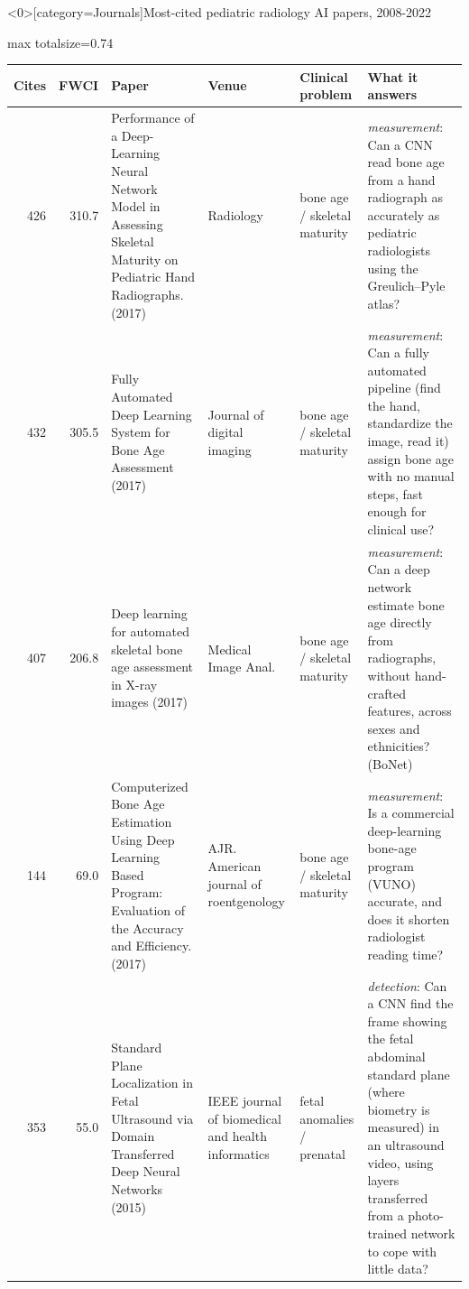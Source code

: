 \documentclass[aspectratio=169]{beamer}
\renewcommand{\arraystretch}{1.08}
\begin{document}
\begin{frame}<0>[category=Journals]{Most-cited pediatric radiology AI papers, 2008-2022}
\tiny
\begin{adjustbox}{max totalsize={\textwidth}{0.74\textheight}}
\renewcommand{\arraystretch}{1.2}
\begin{tabular}{|r|r|>{\raggedright\arraybackslash}p{}|>{\raggedright\arraybackslash}p{}|>{\raggedright\arraybackslash}p{}|>{\raggedright\arraybackslash}p{}|}
\hline \textbf{Cites} & \textbf{FWCI} & \textbf{Paper} & \textbf{Venue} & \textbf{Clinical problem} & \textbf{What it answers} \\ \hline
426 & 310.7 & Performance of a Deep-Learning Neural Network Model in Assessing Skeletal Maturity on Pediatric Hand Radiographs. (2017) & Radiology & bone age / skeletal maturity & \textit{measurement}: Can a CNN read bone age from a hand radiograph as accurately as pediatric radiologists using the Greulich--Pyle atlas? \\ \hline
432 & 305.5 & Fully Automated Deep Learning System for Bone Age Assessment (2017) & Journal of digital imaging & bone age / skeletal maturity & \textit{measurement}: Can a fully automated pipeline (find the hand, standardize the image, read it) assign bone age with no manual steps, fast enough for clinical use? \\ \hline
407 & 206.8 & Deep learning for automated skeletal bone age assessment in X-ray images (2017) & Medical Image Anal. & bone age / skeletal maturity & \textit{measurement}: Can a deep network estimate bone age directly from radiographs, without hand-crafted features, across sexes and ethnicities? (BoNet) \\ \hline
144 & 69.0 & Computerized Bone Age Estimation Using Deep Learning Based Program: Evaluation of the Accuracy and Efficiency. (2017) & AJR. American journal of roentgenology & bone age / skeletal maturity & \textit{measurement}: Is a commercial deep-learning bone-age program (VUNO) accurate, and does it shorten radiologist reading time? \\ \hline
353 & 55.0 & Standard Plane Localization in Fetal Ultrasound via Domain Transferred Deep Neural Networks (2015) & IEEE journal of biomedical and health informatics & fetal anomalies / prenatal & \textit{detection}: Can a CNN find the frame showing the fetal abdominal standard plane (where biometry is measured) in an ultrasound video, using layers transferred from a photo-trained network to cope with little data? \\ \hline

\end{tabular}
\end{adjustbox}
\end{frame}
\end{document}

